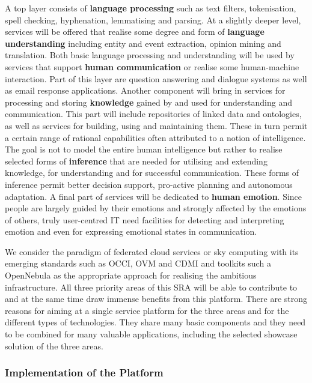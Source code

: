 \documentclass[10pt, plain]{../../metanetpaper}
\begin{document}
\begin{multicols}{2}
A top layer consists of \textbf{language processing} such as text filters, tokenisation, spell checking, hyphenation, lemmatising and parsing. At a slightly deeper level, services will be offered that realise some degree and form of \textbf{language understanding} including entity and event extraction, opinion mining and translation. Both basic language processing and understanding will be used by services that support \textbf{human communication} or realise some human-machine interaction. Part of this layer are question answering and dialogue systems as well as email response applications. Another component will bring in services for processing and storing \textbf{knowledge} gained by and used for understanding and communication. This part will include repositories of linked data and ontologies, as well as services for building, using and maintaining them. These in turn permit a certain range of rational capabilities often attributed to a notion of intelligence. The goal is not to model the entire human intelligence but rather to realise selected forms of \textbf{inference} that are needed for utilising and extending knowledge, for understanding and for successful communication. These forms of inference permit better decision support, pro-active planning and autonomous adaptation. A final part of services will be dedicated to \textbf{human emotion}. Since people are largely guided by their emotions and strongly affected by the emotions of others, truly user-centred IT need facilities for detecting and interpreting emotion and even for expressing emotional states in communication. 

We consider the paradigm of federated cloud services or sky computing with its emerging standards such as OCCI, OVM and CDMI and toolkits such a OpenNebula as the appropriate approach for realising the ambitious infrastructure. All three priority areas of this SRA will be able to contribute to and at the same time draw immense benefits from this platform. There are strong reasons for aiming at a single service platform for the three areas and for the different types of technologies. They share many basic components and they need to be combined for many valuable applications, including the selected showcase solution of the three areas.

 
\subsubsection{Implementation of the Platform}
\label{sec:implementation-of-platform}


\end{multicols}
\end{document}
